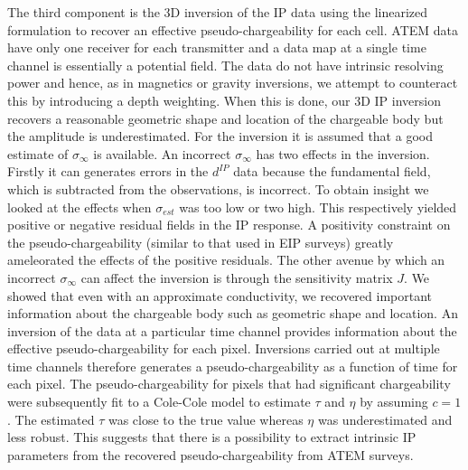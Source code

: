 \documentclass[extra,mreferee]{gji}
\newcommand{\siginf}{\sigma_\infty}
\begin{document}
The third component is the 3D inversion of the IP data using the linearized formulation to recover an effective pseudo-chargeability for each cell. ATEM data have only one receiver for each transmitter and a data map at a single time channel is essentially a potential field. The data do not have intrinsic resolving power and hence, as in magnetics or gravity inversions, we attempt to counteract this by introducing a depth weighting.  When this is done, our 3D IP inversion recovers a reasonable geometric shape and location of the chargeable body but the amplitude is underestimated. For the inversion it is assumed that a good estimate of $\siginf$ is available. An incorrect $\siginf$ has two effects in the inversion. Firstly it can generates errors in the $d^{IP}$ data because the fundamental field, which is subtracted from the observations, is incorrect. To obtain insight we looked at the effects when $\sigma_{est}$ was too low or two high. This respectively yielded positive or negative residual fields in the IP response. A positivity constraint on the pseudo-chargeability (similar to that used in EIP surveys) greatly ameleorated the effects of the positive residuals. The other avenue by which an incorrect $\siginf$ can affect the inversion is through the sensitivity matrix $J$. We showed that even with an approximate conductivity, we recovered important information about the chargeable body such as geometric shape and location. An inversion of the data at a particular time channel provides information about the effective pseudo-chargeability for each pixel. Inversions carried out at multiple time channels therefore generates a pseudo-chargeability as a function of time for each pixel. The pseudo-chargeability for pixels that had significant chargeability were subsequently fit to a Cole-Cole model to estimate $\tau$ and $\eta$ by assuming $c=1$. The estimated $\tau$ was close to the true value whereas $\eta$ was underestimated and less robust. This suggests that there is a possibility to extract intrinsic IP parameters from the recovered pseudo-chargeability from ATEM surveys.  
\end{document}

